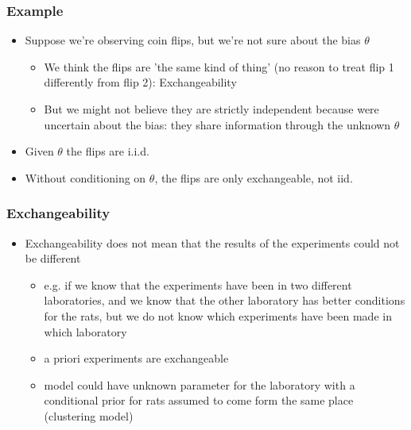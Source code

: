 \documentclass[10pt]{beamer}
\begin{document}
\begin{frame}

\frametitle{Example}

  \begin{itemize}
  \item Suppose we're observing coin flips, but we're not sure about the bias $\theta$
    \begin{itemize}
      \item We think the flips are 'the same kind of thing' (no reason to treat flip 1 differently from flip 2): Exchangeability
      \item But we might not believe they are strictly independent because were uncertain about the bias: they share information through the unknown $\theta$
    \end{itemize}
    \pause
    \item Given $\theta$ the flips are i.i.d.
    \item Without conditioning on $\theta$, the flips are only exchangeable, not iid.
  \end{itemize}
\end{frame}




\begin{frame}

\frametitle{Exchangeability}

  \begin{itemize}
  \item Exchangeability does not mean that the results of the
    experiments could not be different
    \begin{itemize}
    \item e.g. if we know that the experiments have been in two
      different laboratories, and we know that the other laboratory
      has better conditions for the rats, but we do not know which
      experiments have been made in which laboratory
    \item a priori experiments are exchangeable
    \item model could have unknown parameter for the laboratory with a
      conditional prior for rats assumed to come form the same place (clustering model)
    \end{itemize}
  \end{itemize}
\end{frame}
\end{document}

